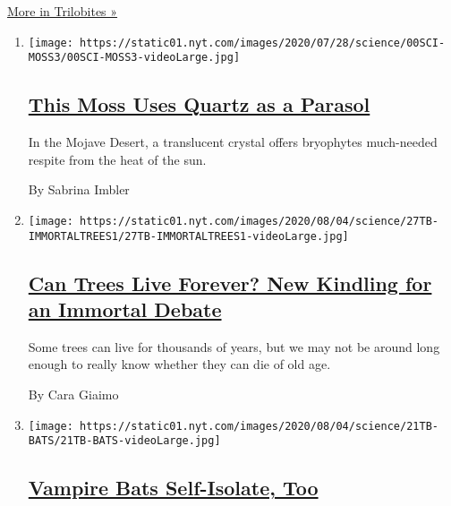 \href{/column/trilobites}{More in Trilobites »}

\begin{enumerate}
\def\labelenumi{\arabic{enumi}.}
\item
  \texttt{[image: https://static01.nyt.com/images/2020/07/28/science/00SCI-MOSS3/00SCI-MOSS3-videoLarge.jpg]}

  \hypertarget{this-moss-uses-quartz-as-a-parasol}{%
  \subsection{\texorpdfstring{\href{/2020/07/29/science/moss-quartz-biology-syntrichia.html}{This
  Moss Uses Quartz as a
  Parasol}}{This Moss Uses Quartz as a Parasol}}\label{this-moss-uses-quartz-as-a-parasol}}

  In the Mojave Desert, a translucent crystal offers bryophytes
  much-needed respite from the heat of the sun.

  By Sabrina Imbler
\item
  \texttt{[image: https://static01.nyt.com/images/2020/08/04/science/27TB-IMMORTALTREES1/27TB-IMMORTALTREES1-videoLarge.jpg]}

  \hypertarget{can-trees-live-forever-new-kindling-for-an-immortal-debate}{%
  \subsection{\texorpdfstring{\href{/2020/07/27/science/trees-immortality.html}{Can
  Trees Live Forever? New Kindling for an Immortal
  Debate}}{Can Trees Live Forever? New Kindling for an Immortal Debate}}\label{can-trees-live-forever-new-kindling-for-an-immortal-debate}}

  Some trees can live for thousands of years, but we may not be around
  long enough to really know whether they can die of old age.

  By Cara Giaimo
\item
  \texttt{[image: https://static01.nyt.com/images/2020/08/04/science/21TB-BATS/21TB-BATS-videoLarge.jpg]}

  \hypertarget{vampire-bats-self-isolate-too}{%
  \subsection{\texorpdfstring{\href{/2020/07/22/science/vampire-bats-viruses.html}{Vampire
  Bats Self-Isolate,
  Too}}{Vampire Bats Self-Isolate, Too}}\label{vampire-bats-self-isolate-too}}


\end{enumerate}
